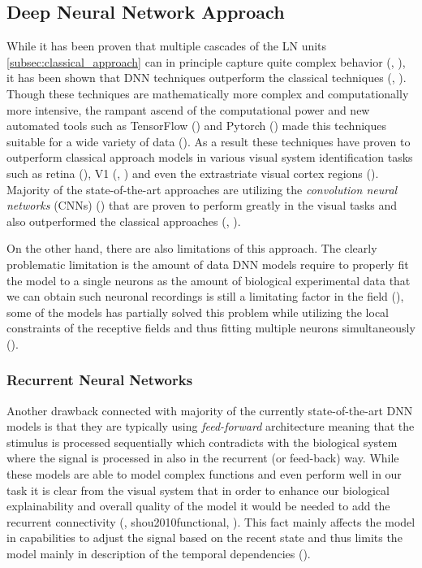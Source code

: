 \subsection{Deep Neural Network Approach}
\label{subsec:deep_learning_approach}
While it has been proven that multiple cascades of the LN units \ref{subsec:classical_approach} can in principle capture quite complex behavior (\citet{cybenko1989approximation}, \citet{HORNIK1991251}), it has been shown that DNN techniques outperform the classical techniques (\citet{MAL-006}, \citet{Kriegeskorte2015dnn}). Though these techniques are mathematically more complex and computationally more intensive, the rampant ascend of the computational power and new automated tools such as TensorFlow (\citet{TensorFlow}) and Pytorch (\citet{paszke2017automatic}) made this techniques suitable for a wide variety of data (\citet{lecun2015deep}). As a result these techniques have proven to outperform classical approach models in various visual system identification tasks such as retina (\citet{Maheswaranathan340943}), V1 (\citet{cadena2019conv}, \citet{kindel2017usingdeeplearningreveal}) and even the extrastriate visual cortex regions (\citet{zareh2024deep}). Majority of the state-of-the-art approaches are utilizing the \emph{convolution neural networks} (CNNs) (\citet{NIPS2012_c399862d}) that are proven to perform greatly in the visual tasks and also outperformed the classical approaches (\citet{zhang2019convolutional}, \citet{cadena2019conv}).

On the other hand, there are also limitations of this approach. The clearly problematic limitation is the amount of data DNN models require to properly fit the model to a single neurons as the amount of biological experimental data that we can obtain such neuronal recordings is still a limitating factor in the field (\citet{zhang2019convolutional}), some of the models has partially solved this problem while utilizing the local constraints of the receptive fields and thus fitting multiple neurons simultaneously (\citet{antolik2016local}). 


\subsubsection{Recurrent Neural Networks}
\label{subsubsec:rnns}
Another drawback connected with majority of the currently state-of-the-art DNN models is that they are typically using \emph{feed-forward} architecture meaning that the stimulus is processed sequentially which contradicts with the biological system where the signal is processed in also in the recurrent (or feed-back) way. While these models are able to model complex functions and even perform well in our task it is clear from the visual system that in order to enhance our biological explainability and overall quality of the model it would be needed to add the recurrent connectivity (\citet{Kafaligonul2015rnn}, {shou2010functional}, \citet{kar2019evidence}). This fact mainly affects the model in capabilities to adjust the signal based on the recent state and thus limits the model mainly in description of the temporal dependencies (\citet{shou2010functional}).

